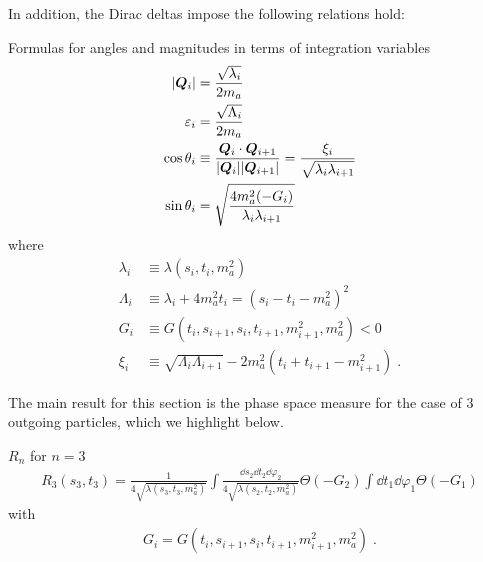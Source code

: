 In addition, the Dirac deltas impose the following relations hold: 
\begin{bluenv}{Formulas for angles and magnitudes in terms of integration variables}
    \vspace{-2ex}
    \begin{align}
        |\bm{Q}_{i}| &= \frac{\sqrt{\lambda_i}}{2 m_a} \label{eq:Qmag-formula}\\
        \varepsilon_i &= \frac{\sqrt{\Lambda_i}}{2 m_a} \label{eq:B-epsilon-formula}\\
        \cos \theta_i &\equiv \frac{\bm{Q}_{i}\cdot\bm{Q}_{i+1}}{|\bm{Q}_{i}||\bm{Q}_{i+1}|} 
            =  \frac{\xi_i}{\sqrt{\lambda_i \lambda_{i+1}}} \label{eq:B-costheta-formula}\\
        \sin\theta_i &= \sqrt{\frac{4 m_a^2 (-G_{i})}{\lambda_{i} \lambda_{i+1}}} \label{eq:sintheta-formula}
    \end{align}
    where
    \begin{align}
        \label{eq:lambda-definitions}
        \lambda_i &\equiv \lambda(s_i, t_i, m_a^2) \\
        \Lambda_i &\equiv \lambda_i + 4 m_a^2 t_i = (s_i - t_i - m_a^2)^2 \\
        G_i &\equiv G(t_i, s_{i+1}, s_i, t_{i+1}, m_{i+1}^2, m_a^2) < 0 \\
        \label{eq:xi-definition}
        \xi_i &\equiv \sqrt{\Lambda_i \Lambda_{i+1}} - 2 m_a^2 (t_i + t_{i+1} - m_{i+1}^2) \; .
    \end{align}
\end{bluenv}

The main result for this section is the phase space measure for the case of $3$ outgoing particles, which we highlight below.
\begin{bluenv}{$R_n$ for $n = 3$}
    \vspace{-3ex}
    \begin{align}
        \label{eq:recursive-phase-space-with-momentum-transfer-for-n-equal-3}
        R_3(s_3, t_3) 
            = \frac{1}{4\sqrt{\lambda(s_3, t_3, m_a^2)}}
              \int \frac{\dd s_2 \dd t_2 \dd \varphi_2}
                        {4 \sqrt{\lambda(s_2, t_2, m_a^2)}}
              \Theta(- G_2) 
              \int \dd t_1 \dd \varphi_1 \Theta(- G_1)
    \end{align}
    with 
    \begin{gather}
        G_i = G(t_i, s_{i+1}, s_i, t_{i+1}, m_{i+1}^2, m_a^2) \; .
    \end{gather}
\end{bluenv}

